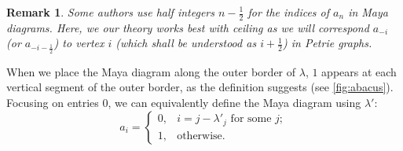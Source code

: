 \documentclass[pdflatex,sn-mathphys-num]{sn-jnl}%
\theoremstyle{thmstyleone}%
\theoremstyle{thmstyletwo}%
\newtheorem{remark}[theorem]{Remark}
\theoremstyle{thmstylethree}%
\numberwithin{equation}{section}
\begin{document}
    \begin{remark}
        Some authors use half integers $n-\frac12$ for the indices of $a_n$ in Maya diagrams. Here, we our theory works best with ceiling as we will correspond $a_{-i}$ (or $a_{-i-\frac 12}$) to vertex $i$ (which shall be understood as $i+\frac 12$) in Petrie graphs.
    \end{remark}
    
	When we place the Maya diagram along the outer border of $\lambda$, $1$ appears at each vertical segment of the outer border, as the definition suggests (see \cref{fig:abacus}). Focusing on entries $0$, we can equivalently define the Maya diagram using $\lambda'$:
	\[a_i = \begin{cases}
		0, & i=j-\lambda'_j \text{ for some }j;\\
		1, &\text{otherwise}.
	\end{cases}\]
\end{document}
